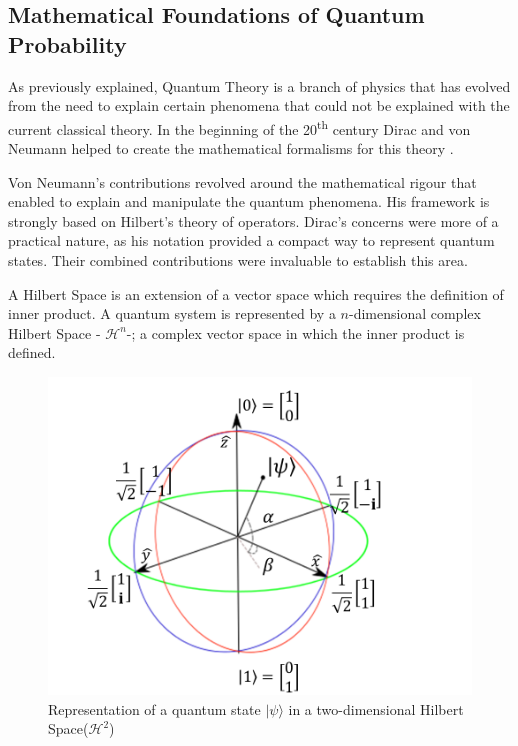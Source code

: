 \subsection{Mathematical Foundations of Quantum Probability} 
\label{subsec:mathematical_foundations}

As previously explained, Quantum Theory is a branch of physics that has evolved from the need to explain certain phenomena that could not be explained with the current classical theory.
In the beginning of the 20\textsuperscript{th} century Dirac and von Neumann  helped to create the mathematical formalisms for this theory \cite{sep-qt-nvd}\cite{Summers2006}. 

Von Neumann's contributions revolved around the mathematical rigour that enabled to explain and manipulate the quantum phenomena. His framework is strongly based on Hilbert's theory of operators. Dirac's concerns were more of a practical nature, as his notation provided a compact way to represent quantum states. Their combined contributions were invaluable to establish this area. 

A Hilbert Space is an extension of a vector space which requires the definition of inner product. A quantum system is represented by a $n$-dimensional complex Hilbert Space - $\mathcal{H}^{n}$-; a complex vector space in which the inner product is defined. 

\begin{figure}[h]
\centering 

\includegraphics[scale=0.35]{Figures/bloch_sphere.png}
\caption{Representation of a quantum state $\vert \psi \rangle $ in a two-dimensional Hilbert Space($\mathcal{H}^{2}$)}
\label{fig:circle}
\end{figure}



